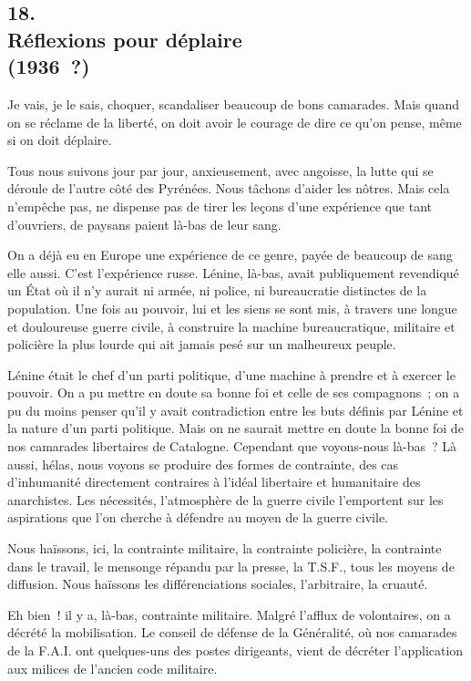 \documentclass[french,twoside]{book} %
\begin{document}
\subsection[{18. Réflexions pour déplaire, (1936 ?)}]{18. \\
Réflexions pour déplaire \\
(1936 ?)}
\noindent \par
Je vais, je le sais, choquer, scandaliser beaucoup de bons camarades. Mais quand on se réclame de la liberté, on doit avoir le courage de dire ce qu'on pense, même si on doit déplaire.\par
Tous nous suivons jour par jour, anxieusement, avec angoisse, la lutte qui se déroule de l'autre côté des Pyrénées. Nous tâchons d'aider les nôtres. Mais cela n'empêche pas, ne dispense pas de tirer les leçons d'une expérience que tant d'ouvriers, de paysans paient là-bas de leur sang.\par
On a déjà eu en Europe une expérience de ce genre, payée de beaucoup de sang elle aussi. C'est l'expérience russe. Lénine, là-bas, avait publiquement revendiqué un État où il n'y aurait ni armée, ni police, ni bureaucratie distinc­tes de la population. Une fois au pouvoir, lui et les siens se sont mis, à travers une longue et douloureuse guerre civile, à construire la machine bureau­cratique, militaire et policière la plus lourde qui ait jamais pesé sur un malheureux peuple.\par
Lénine était le chef d'un parti politique, d'une machine à prendre et à exercer le pouvoir. On a pu mettre en doute sa bonne foi et celle de ses compagnons ; on a pu du moins penser qu'il y avait contradiction entre les buts définis par Lénine et la nature d'un parti politique. Mais on ne saurait mettre en doute la bonne foi de nos camarades libertaires de Catalogne. Cependant que voyons-nous là-bas ? Là aussi, hélas, nous voyons se produire des formes de contrainte, des cas d'inhumanité directement contraires à l'idéal libertaire et humanitaire des anarchistes. Les nécessités, l'atmosphère de la guerre civile l'emportent sur les aspirations que l'on cherche à défendre au moyen de la guerre civile.\par
Nous haïssons, ici, la contrainte militaire, la contrainte policière, la con­trainte dans le travail, le mensonge répandu par la presse, la T.S.F., tous les moyens de diffusion. Nous haïssons les différenciations sociales, l'arbitraire, la cruauté.\par
Eh bien ! il y a, là-bas, contrainte militaire. Malgré l'afflux de volontaires, on a décrété la mobilisation. Le conseil de défense de la Généralité, où nos camarades de la F.A.I. ont quelques-uns des postes dirigeants, vient de décré­ter l'application aux milices de l'ancien code militaire.\par
\end{document}
